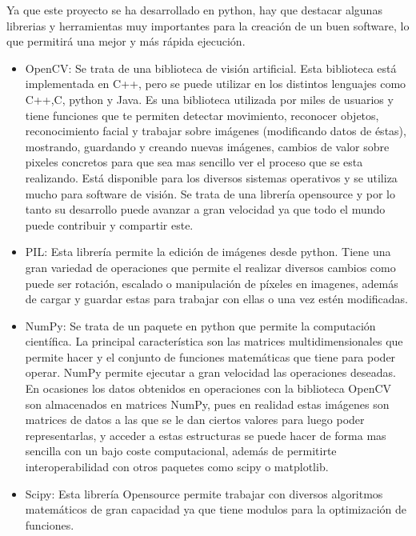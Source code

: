 \documentclass{article}
\begin{document}
\hspace{1 cm} Ya que este proyecto se ha desarrollado en python, hay que destacar algunas librerias y herramientas muy importantes para la creaci\'on de un buen software, lo que permitir\'a una mejor y m\'as r\'apida ejecuci\'on. 
	\begin{itemize}
	\item OpenCV: Se trata de una biblioteca de visi\'on artificial. Esta biblioteca est\'a implementada en C++, pero se puede utilizar en los distintos lenguajes como C++,C, python y Java. Es una biblioteca utilizada por miles de usuarios y tiene funciones que te permiten detectar movimiento, reconocer objetos, reconocimiento facial y trabajar sobre im\'agenes (modificando datos de \'estas), mostrando, guardando y creando nuevas im\'agenes, cambios de valor sobre pixeles concretos para que sea mas sencillo ver el proceso que se esta realizando. Est\'a disponible para los diversos sistemas operativos y se utiliza mucho para software de visi\'on. Se trata de una librer\'ia opensource y por lo tanto su desarrollo puede avanzar a gran velocidad ya que todo el mundo puede contribuir y compartir este.
	
	\item PIL: Esta librer\'ia permite la edici\'on de im\'agenes desde python. Tiene una gran variedad de operaciones que permite el realizar diversos cambios como puede ser rotaci\'on, escalado o manipulaci\'on de p\'ixeles en imagenes, adem\'as de cargar y guardar estas para trabajar con ellas o una vez est\'en modificadas. 
	
	\item NumPy: Se trata de un paquete en python que permite la computaci\'on cient\'ifica. La principal caracter\'istica son las matrices multidimensionales que permite hacer y el conjunto de funciones matem\'aticas que tiene para poder operar. NumPy permite ejecutar a gran velocidad las operaciones deseadas. En ocasiones los datos obtenidos en operaciones con la biblioteca OpenCV son almacenados en matrices NumPy, pues en realidad estas im\'agenes son matrices de datos a las que se le dan ciertos valores para luego poder representarlas, y acceder a estas estructuras se puede hacer de forma mas sencilla con un bajo coste computacional, adem\'as de permitirte interoperabilidad con otros paquetes como scipy o matplotlib. 

	\item Scipy: Esta librer\'ia Opensource permite trabajar con diversos algoritmos matem\'aticos de gran capacidad ya que tiene modulos para la optimizaci\'on de funciones. 
	\end{itemize}
	
\end{document}
